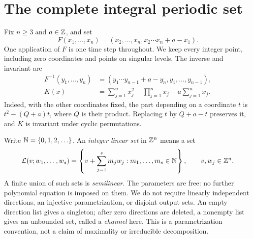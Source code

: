 \section{The complete integral periodic set}
\label{sec:statement}

Fix $n\ge3$ and $a\in\mathbb Z$, and set
\begin{equation}
 F(x_1,\ldots,x_n)
 =(x_2,\ldots,x_n,x_2\cdots x_n+a-x_1).
 \label{eq:map}
\end{equation}
One application of $F$ is one time step throughout. We keep every
integer point, including zero coordinates and points on singular levels.
The inverse and invariant are
\begin{align}
 F^{-1}(y_1,\ldots,y_n)
   &=(y_1\cdots y_{n-1}+a-y_n,y_1,\ldots,y_{n-1}),\label{eq:inverse}\\
 K(x)&=\sum_{j=1}^n x_j^2-\prod_{j=1}^n x_j-a\sum_{j=1}^n x_j.
 \label{eq:invariant}
\end{align}
Indeed, with the other coordinates fixed, the part depending on a
coordinate $t$ is $t^2-(Q+a)t$, where $Q$ is their product.
Replacing $t$ by $Q+a-t$ preserves it, and $K$ is invariant under
cyclic permutations.

Write $\mathbb N=\{0,1,2,\ldots\}$. An \emph{integer linear set} in $\mathbb Z^n$
means a set
\begin{equation}
 \mathcal L(v;w_1,\ldots,w_s)
   =\left\{v+\sum_{j=1}^s m_jw_j:m_1,\ldots,m_s\in\mathbb N\right\},
 \qquad v,w_j\in\mathbb Z^n.\label{eq:linear-set}
\end{equation}
A finite union of such sets is \emph{semilinear}. The parameters are
free: no further polynomial equation is imposed on them. We do not
require linearly independent directions, an injective parametrization,
or disjoint output sets. An empty direction list gives a singleton;
after zero directions are deleted, a nonempty list gives an unbounded
set, called a \emph{channel} here. This is a parametrization convention,
not a claim of maximality or irreducible decomposition.

